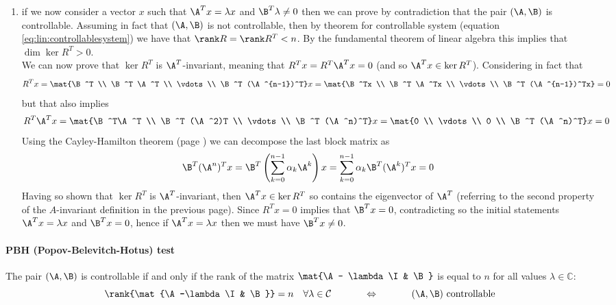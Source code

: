 \begin{enumerate}[\itshape i)]
		\item if we now consider a vector $x$ such that $\A^T x = \lambda x$ and $\B^T \lambda \neq 0$ then we can prove by contradiction that the pair $(\A, \B)$ is controllable. Assuming in fact that $(\A,\B)$ is not controllable, then by theorem for controllable system (equation \ref{eq:lin:controllablesystem}) we have that $\rank R = \rank R^T < n$. By the fundamental theorem of linear algebra this implies that  $\dim \ker R^T > 0$.\\
		We can now prove that $\ker R^T$ is $\A^T$-invariant, meaning that $R^T x = R^T	\A^T x = 0$ (and so $\A^Tx \in \ker R^T$). Considering in fact that
		\[ R^T x = \mat{\B^T \\ \B^T \A^T \\ \vdots \\ \B^T (\A^{n-1})^T} x = \mat{\B^Tx \\ \B^T \A^Tx \\ \vdots \\ \B^T (\A^{n-1})^Tx} = 0 \]
		but that also implies
		\[ R^T \A^T x = \mat{\B^T\A^T \\ \B^T (\A^2)T \\ \vdots \\ \B^T (\A^n)^T} x = \mat{0 \\ \vdots \\ 0 \\ \B^T (\A^n)^T} x = 0 \]
		Using the Cayley-Hamilton theorem (page \pageref{eq:lin:cayley}) we can decompose the last block matrix as 
		\[ \B^T(\A^n)^T x = \B^T \left( \sum_{k=0}^{n-1} \alpha_k \A^k \right) x = \sum_{k=0}^{n-1} \alpha_k \B^T(\A^k)^T x = 0 \]
		Having so shown that $\ker R^T$ is $\A^T$-invariant, then $\A^T x \in \ker R^T$ so contains the eigenvector of $\A^T$ (referring to the second property of the $A$-invariant definition in the previous page). Since $R^T x = 0$ implies that $\B^T x = 0$, contradicting so the initial statements $\A^T x = \lambda x$ and $\B^T x = 0$, hence if $\A^T x = \lambda x$ then we must have $\B^T x \neq 0$.		
	\end{enumerate}
		
	\paragraph{PBH (Popov-Belevitch-Hotus) test} The pair $(\A,\B)$ is controllable if and only if the rank of the matrix $\mat{\A- \lambda \I & \B}$ is equal to $n$ for all values $\lambda \in \mathds C$:
	\begin{equation}
		\rank{\mat{\A-\lambda \I & \B}} = n \quad \forall \lambda \in \mathcal C \hspace{1.2cm} \Leftrightarrow \hspace{1.2cm} (\A,\B) \textrm{ controllable}
	\end{equation}
	
